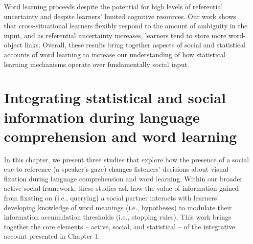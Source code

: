 \documentclass[oneside]{report}
\begin{document}
Word learning proceeds despite the potential for high levels of
referential uncertainty and despite learners' limited cognitive
resources. Our work shows that cross-situational learners flexibly
respond to the amount of ambiguity in the input, and as referential
uncertainty increases, learners tend to store more word-object links.
Overall, these results bring together aspects of social and statistical
accounts of word learning to increase our understanding of how
statistical learning mechanisms operate over fundamentally social input.

\chapter{Integrating statistical and social information during language
comprehension and word
learning}\label{integrating-statistical-and-social-information-during-language-comprehension-and-word-learning}


In this chapter, we present three studies that explore how the presence
of a social cue to reference (a speaker's gaze) changes listeners'
decisions about visual fixation during language comprehension and word
learning. Within our broader active-social framework, these studies ask
how the value of information gained from fixating on (i.e., querying) a
social partner interacts with learners' developing knowledge of word
meanings (i.e., hypotheses) to modulate their information accumulation
thresholds (i.e., stopping rules). This work brings together the core
elements -- active, social, and statistical -- of the integrative
account presented in Chapter 1.
\end{document}
